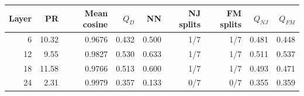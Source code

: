 \begin{tabular}{rrrrrrrrr}
\toprule
Layer & PR & Mean cosine & $Q_D$ & NN & NJ splits & FM splits & $Q_{NJ}$ & $Q_{FM}$ \\
\midrule
6 & 10.32 & 0.9676 & 0.432 & 0.500 & 1/7 & 1/7 & 0.481 & 0.448 \\
12 & 9.55 & 0.9827 & 0.530 & 0.633 & 1/7 & 1/7 & 0.511 & 0.537 \\
18 & 11.58 & 0.9766 & 0.513 & 0.600 & 1/7 & 1/7 & 0.493 & 0.471 \\
24 & 2.31 & 0.9979 & 0.357 & 0.133 & 0/7 & 0/7 & 0.355 & 0.359 \\
\bottomrule
\end{tabular}
